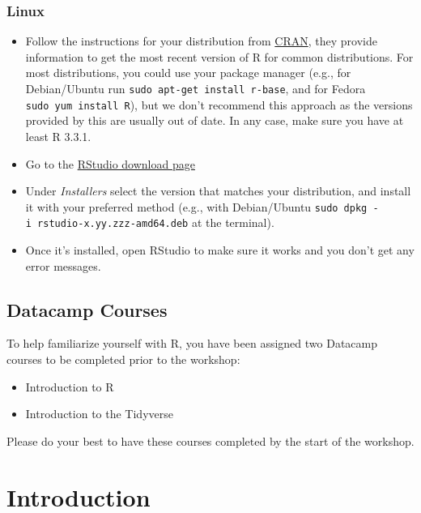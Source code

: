 \documentclass[
]{book}
\providecommand{\tightlist}{%
  \setlength{\itemsep}{0pt}\setlength{\parskip}{0pt}}
\begin{document}
\hypertarget{linux}{%
\subsection{Linux}\label{linux}}

\begin{itemize}
\tightlist
\item
  Follow the instructions for your distribution
  from \href{https://cloud.r-project.org/bin/linux}{CRAN}, they provide information
  to get the most recent version of R for common distributions. For most
  distributions, you could use your package manager (e.g., for Debian/Ubuntu run
  \texttt{sudo\ apt-get\ install\ r-base}, and for Fedora \texttt{sudo\ yum\ install\ R}), but we
  don't recommend this approach as the versions provided by this are
  usually out of date. In any case, make sure you have at least R 3.3.1.
\item
  Go to the
  \href{https://www.rstudio.com/products/rstudio/download/\#download}{RStudio download page}
\item
  Under \emph{Installers} select the version that matches your distribution, and
  install it with your preferred method (e.g., with Debian/Ubuntu \texttt{sudo\ dpkg\ -i\ rstudio-x.yy.zzz-amd64.deb} at the terminal).
\item
  Once it's installed, open RStudio to make sure it works and you don't get any
  error messages.
\end{itemize}

\hypertarget{datacamp-courses}{%
\section{Datacamp Courses}\label{datacamp-courses}}

To help familiarize yourself with R, you have been assigned two Datacamp courses to be completed prior to the workshop:

\begin{itemize}
\tightlist
\item
  Introduction to R
\item
  Introduction to the Tidyverse
\end{itemize}

Please do your best to have these courses completed by the start of the workshop.

\hypertarget{introduction}{%
\chapter{Introduction}\label{introduction}}
\end{document}
